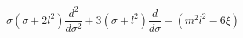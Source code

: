 \begin{equation}
\sigma(\sigma +2l^2) \frac{d^2}{d\sigma^2} +3(\sigma+l^2)\frac{d}{d\sigma}
- (m^2 l^2 -6\xi)
\end{equation}

